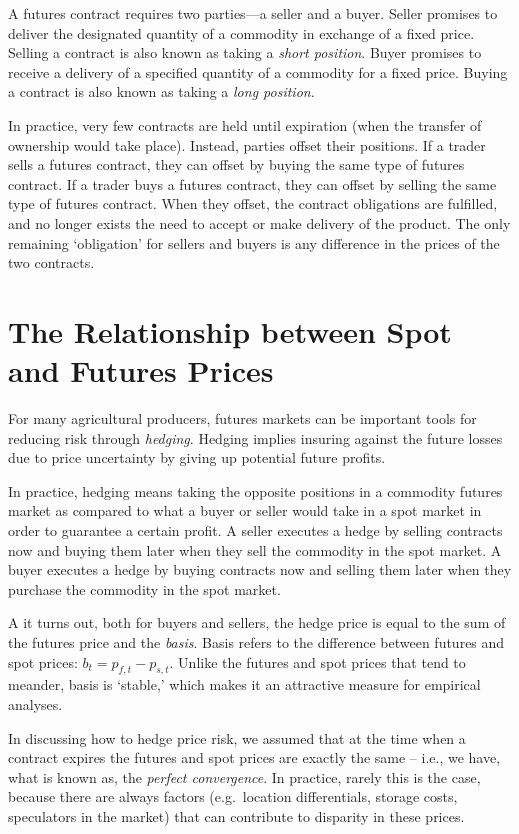 \documentclass[
]{book}
\begin{document}
A futures contract requires two parties---a seller and a buyer. Seller promises to deliver the designated quantity of a commodity in exchange of a fixed price. Selling a contract is also known as taking a \emph{short position}. Buyer promises to receive a delivery of a specified quantity of a commodity for a fixed price. Buying a contract is also known as taking a \emph{long position}.

In practice, very few contracts are held until expiration (when the transfer of ownership would take place). Instead, parties offset their positions. If a trader sells a futures contract, they can offset by buying the same type of futures contract. If a trader buys a futures contract, they can offset by selling the same type of futures contract. When they offset, the contract obligations are fulfilled, and no longer exists the need to accept or make delivery of the product. The only remaining `obligation' for sellers and buyers is any difference in the prices of the two contracts.

\hypertarget{the-relationship-between-spot-and-futures-prices}{%
\section{The Relationship between Spot and Futures Prices}\label{the-relationship-between-spot-and-futures-prices}}

For many agricultural producers, futures markets can be important tools for reducing risk through \emph{hedging}. Hedging implies insuring against the future losses due to price uncertainty by giving up potential future profits.

In practice, hedging means taking the opposite positions in a commodity futures market as compared to what a buyer or seller would take in a spot market in order to guarantee a certain profit. A seller executes a hedge by selling contracts now and buying them later when they sell the commodity in the spot market. A buyer executes a hedge by buying contracts now and selling them later when they purchase the commodity in the spot market.

A it turns out, both for buyers and sellers, the hedge price is equal to the sum of the futures price and the \emph{basis}. Basis refers to the difference between futures and spot prices: \(b_{t} = p_{f,t}-p_{s,t}\). Unlike the futures and spot prices that tend to meander, basis is `stable,' which makes it an attractive measure for empirical analyses.

In discussing how to hedge price risk, we assumed that at the time when a contract expires the futures and spot prices are exactly the same -- i.e., we have, what is known as, the \emph{perfect convergence}. In practice, rarely this is the case, because there are always factors (e.g.~location differentials, storage costs, speculators in the market) that can contribute to disparity in these prices.
\end{document}

